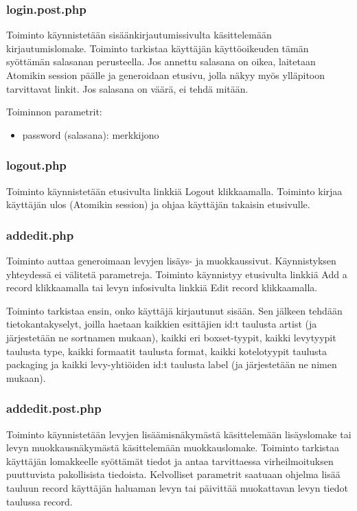 \documentclass[a4paper,12pt]{report}
\begin{document}
\subsubsection{login.post.php}

Toiminto käynnistetään sisäänkirjautumissivulta käsittelemään
kirjautumislomake. Toiminto tarkistaa käyttäjän käyttöoikeuden tämän
syöttämän salasanan perusteella.  Jos annettu salasana on oikea, laitetaan
Atomikin session päälle ja generoidaan etusivu, jolla näkyy myös ylläpitoon
tarvittavat linkit. Jos salasana on väärä, ei tehdä mitään.

Toiminnon parametrit:
\begin{itemize}
  \item password (salasana): merkkijono
\end{itemize}

\subsubsection{logout.php}

Toiminto käynnistetään etusivulta linkkiä Logout klikkaamalla. Toiminto
kirjaa käyttäjän ulos (Atomikin session) ja ohjaa käyttäjän takaisin
etusivulle.

\subsubsection{addedit.php}

Toiminto auttaa generoimaan levyjen lisäys- ja muokkaussivut. Käynnistyksen
yhteydessä ei välitetä parametreja.  Toiminto käynnistyy etusivulta linkkiä
Add a record klikkaamalla tai levyn infosivulta linkkiä Edit record
klikkaamalla.

Toiminto tarkistaa ensin, onko käyttäjä kirjautunut sisään.  Sen jälkeen
tehdään tietokantakyselyt, joilla haetaan kaikkien esittäjien id:t taulusta
artist (ja järjestetään ne sortnamen mukaan), kaikki eri boxset-tyypit,
kaikki levytyypit taulusta type, kaikki formaatit taulusta format, kaikki
kotelotyypit taulusta packaging ja kaikki levy-yhtiöiden id:t taulusta label
(ja järjestetään ne nimen mukaan).

\subsubsection{addedit.post.php}

Toiminto käynnistetään levyjen lisäämisnäkymästä käsittelemään lisäyslomake
tai levyn muokkausnäkymästä käsittelemään muokkauslomake.  Toiminto
tarkistaa käyttäjän lomakkeelle syöttämät tiedot ja antaa tarvittaessa
virheilmoituksen puuttuvista pakollisista tiedoista.  Kelvolliset parametrit
saatuaan ohjelma lisää tauluun record käyttäjän haluaman levyn tai päivittää
muokattavan levyn tiedot taulussa record.
\end{document}
